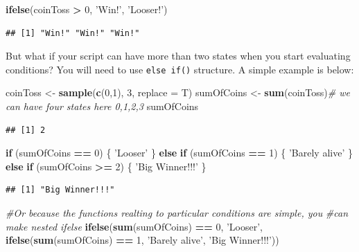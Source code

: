 \documentclass[]{book}
\newenvironment{Shaded}{\begin{snugshade}}{\end{snugshade}}
\newcommand{\KeywordTok}[1]{\textcolor[rgb]{0.13,0.29,0.53}{\textbf{#1}}}
\newcommand{\DataTypeTok}[1]{\textcolor[rgb]{0.13,0.29,0.53}{#1}}
\newcommand{\DecValTok}[1]{\textcolor[rgb]{0.00,0.00,0.81}{#1}}
\newcommand{\StringTok}[1]{\textcolor[rgb]{0.31,0.60,0.02}{#1}}
\newcommand{\CommentTok}[1]{\textcolor[rgb]{0.56,0.35,0.01}{\textit{#1}}}
\newcommand{\ControlFlowTok}[1]{\textcolor[rgb]{0.13,0.29,0.53}{\textbf{#1}}}
\newcommand{\OperatorTok}[1]{\textcolor[rgb]{0.81,0.36,0.00}{\textbf{#1}}}
\newcommand{\NormalTok}[1]{#1}
\theoremstyle{definition}
\theoremstyle{definition}
\theoremstyle{definition}
\theoremstyle{remark}
\begin{document}
\begin{Shaded}
\begin{Highlighting}[]
\KeywordTok{ifelse}\NormalTok{(coinToss }\OperatorTok{>}\StringTok{ }\DecValTok{0}\NormalTok{, }\StringTok{'Win!'}\NormalTok{, }\StringTok{'Looser!'}\NormalTok{)}
\end{Highlighting}
\end{Shaded}

\begin{verbatim}
## [1] "Win!" "Win!" "Win!"
\end{verbatim}

But what if your script can have more than two states when you start
evaluating conditions? You will need to use \texttt{else\ if()}
structure. A simple example is below:

\begin{Shaded}
\begin{Highlighting}[]
\NormalTok{coinToss <-}\StringTok{ }\KeywordTok{sample}\NormalTok{(}\KeywordTok{c}\NormalTok{(}\DecValTok{0}\NormalTok{,}\DecValTok{1}\NormalTok{), }\DecValTok{3}\NormalTok{, }\DataTypeTok{replace =}\NormalTok{ T)}
\NormalTok{sumOfCoins <-}\StringTok{ }\KeywordTok{sum}\NormalTok{(coinToss)}\CommentTok{# we can have four states here 0,1,2,3}
\NormalTok{sumOfCoins}
\end{Highlighting}
\end{Shaded}

\begin{verbatim}
## [1] 2
\end{verbatim}

\begin{Shaded}
\begin{Highlighting}[]
\ControlFlowTok{if}\NormalTok{ (sumOfCoins }\OperatorTok{==}\StringTok{ }\DecValTok{0}\NormalTok{) \{}
  \StringTok{'Looser'}
\NormalTok{\} }\ControlFlowTok{else} \ControlFlowTok{if}\NormalTok{ (sumOfCoins }\OperatorTok{==}\StringTok{ }\DecValTok{1}\NormalTok{) \{}
  \StringTok{'Barely alive'}
\NormalTok{\} }\ControlFlowTok{else} \ControlFlowTok{if}\NormalTok{ (sumOfCoins }\OperatorTok{>=}\StringTok{ }\DecValTok{2}\NormalTok{) \{}
  \StringTok{'Big Winner!!!'}
\NormalTok{\}}
\end{Highlighting}
\end{Shaded}

\begin{verbatim}
## [1] "Big Winner!!!"
\end{verbatim}

\begin{Shaded}
\begin{Highlighting}[]
\CommentTok{#Or because the functions realting to particular conditions are simple, you}
\CommentTok{#can make nested ifelse}
\KeywordTok{ifelse}\NormalTok{(}\KeywordTok{sum}\NormalTok{(sumOfCoins) }\OperatorTok{==}\StringTok{ }\DecValTok{0}\NormalTok{, }\StringTok{'Looser'}\NormalTok{,}
       \KeywordTok{ifelse}\NormalTok{(}\KeywordTok{sum}\NormalTok{(sumOfCoins) }\OperatorTok{==}\StringTok{ }\DecValTok{1}\NormalTok{, }\StringTok{'Barely alive'}\NormalTok{, }\StringTok{'Big Winner!!!'}\NormalTok{))}
\end{Highlighting}
\end{Shaded}
\end{document}
